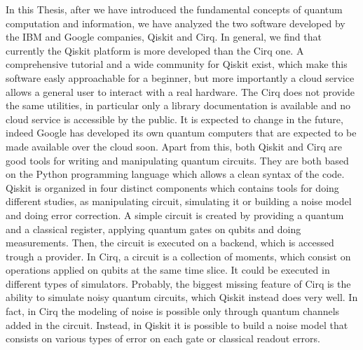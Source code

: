 \documentclass[11pt, a4paper, twoside, openright]{book}
\renewcommand{\'}[0]{\`}
\theoremstyle{definition}
\begin{document}
In this Thesis, after we have introduced the fundamental concepts of quantum computation and information, we have analyzed the two software developed by the IBM and Google companies, Qiskit and Cirq. 
In general, we find that currently the Qiskit platform is more developed than the Cirq one. A comprehensive tutorial and a wide community for Qiskit exist, which make this software easly approachable for a beginner, but more importantly a cloud service allows a general user to interact with a real hardware. 
The Cirq does not provide the same utilities, in particular only a library documentation is available and no cloud service is accessible by the public. It is expected to change in the future, indeed Google has developed its own quantum computers that are expected to be made available over the cloud soon. 
Apart from this, both Qiskit and Cirq are good tools for writing and manipulating quantum circuits. They are both based on the Python programming language which allows a clean syntax of the code. 
Qiskit is organized in four distinct components which contains tools for doing different studies, as manipulating circuit, simulating it or building a noise model and doing error correction. A simple circuit is created by providing a quantum and a classical register, applying quantum gates on qubits and doing measurements. Then, the circuit is executed on a backend, which is accessed trough a provider.
  In Cirq,  a circuit is a collection of moments, which consist on operations applied on qubits at the same time slice. It could be executed in different types of simulators. 
Probably, the biggest missing feature of Cirq is the ability to simulate noisy quantum circuits, which Qiskit instead does very well. In fact, in Cirq the modeling of noise is possible only through quantum channels added in the circuit. Instead, in Qiskit it is possible to build a noise model that consists on various types of error on each gate or classical readout errors.
\end{document}

